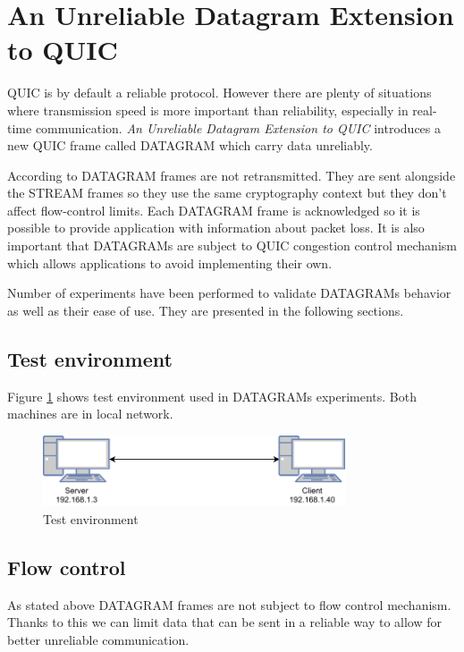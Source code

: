 \section{An Unreliable Datagram Extension to QUIC}
\label{sec:datagrams}
QUIC is by default a reliable protocol.
However there are plenty of situations where transmission speed is more important than reliability, especially in real-time communication.
\textit{An Unreliable Datagram Extension to QUIC} \cite{ietf-quic-datagram-02} introduces a new QUIC frame called DATAGRAM which carry data unreliably.

According to \cite{ietf-quic-datagram-02} DATAGRAM frames are not retransmitted.
They are sent alongside the STREAM frames so they use the same cryptography context but they don't affect flow-control limits.
Each DATAGRAM frame is acknowledged so it is possible to provide application with information about packet loss.
It is also important that DATAGRAMs are subject to QUIC congestion control mechanism which allows applications to avoid implementing their own.

Number of experiments have been performed to validate DATAGRAMs behavior as well as their ease of use.
They are presented in the following sections.

\subsection{Test environment}
\label{sec:test_env}
Figure \ref{fig:dgram_test_env} shows test environment used in DATAGRAMs experiments.
Both machines are in local network.
 
\begin{figure}[h]
  \centering
  \includegraphics[width=0.8\textwidth]{img/__09__datagrams/dgram_test_env.pdf}
  \caption{Test environment}
  \label{fig:dgram_test_env}
\end{figure}
\subsection{Flow control}
As stated above DATAGRAM frames are not subject to flow control mechanism.
Thanks to this we can limit data that can be sent in a reliable way to allow for better unreliable communication.
